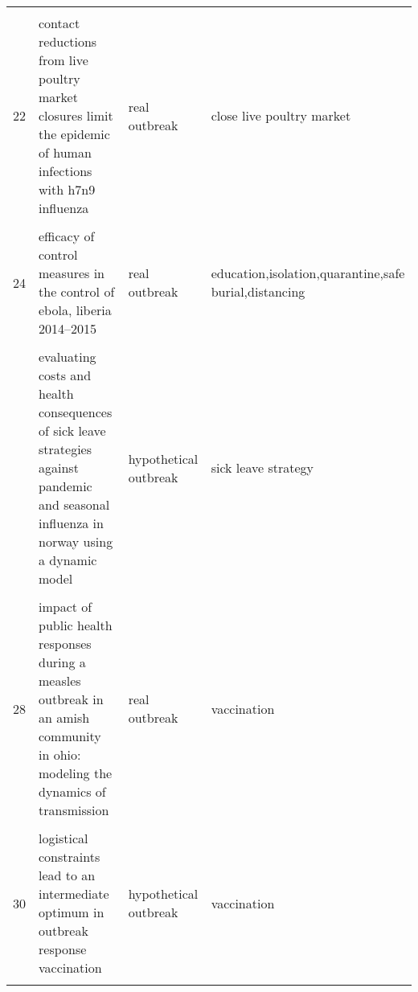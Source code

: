 \documentclass[
]{article}
\begin{document}
\begin{landscape}
\begin{longtable}{l>{\raggedright\arraybackslash}p{3cm}l>{\raggedright\arraybackslash}p{8cm}}
\addlinespace
\cellcolor{gray!6}{21} & \cellcolor{gray!6}{a new epidemics–logistics model: insights into controlling the ebola virus disease in west africa} & \cellcolor{gray!6}{real outbreak} & \cellcolor{gray!6}{ebola treatment units}\\
22 & contact reductions from live poultry market closures limit the epidemic of human infections with h7n9 influenza & real outbreak & close live poultry market\\
\cellcolor{gray!6}{23} & \cellcolor{gray!6}{disparities in spread and control of influenza in slums of delhi: findings from an agent-based modelling study} & \cellcolor{gray!6}{hypothetical outbreak} & \cellcolor{gray!6}{isolation,school closure,vaccination,stay home}\\
24 & efficacy of control measures in the control of ebola, liberia 2014–2015 & real outbreak & education,isolation,quarantine,safe burial,distancing\\
\cellcolor{gray!6}{25} & \cellcolor{gray!6}{epidemiology of the silent polio outbreak in rahat, israel, based on modeling of environmental surveillance data} & \cellcolor{gray!6}{real outbreak} & \cellcolor{gray!6}{vaccination}\\
\addlinespace
26 & evaluating costs and health consequences of sick leave strategies against pandemic and seasonal influenza in norway using a dynamic model & hypothetical outbreak & sick leave strategy\\
\cellcolor{gray!6}{27} & \cellcolor{gray!6}{evaluating vaccination strategies to control foot-and-mouth disease: a country comparison study} & \cellcolor{gray!6}{hypothetical outbreak} & \cellcolor{gray!6}{vaccination,stomping out}\\
28 & impact of public health responses during a measles outbreak in an amish community in ohio: modeling the dynamics of transmission & real outbreak & vaccination\\
\cellcolor{gray!6}{29} & \cellcolor{gray!6}{initial validation of a simulation model for estimating the impact of serogroup a neisseria meningitidis vaccination in the african meningitis belt} & \cellcolor{gray!6}{real outbreak} & \cellcolor{gray!6}{vaccination}\\
30 & logistical constraints lead to an intermediate optimum in outbreak response vaccination & hypothetical outbreak & vaccination\\
\addlinespace
\cellcolor{gray!6}{31} & \cellcolor{gray!6}{manipulation of contact network structure and the impact on foot-and-mouth disease transmission} & \cellcolor{gray!6}{real outbreak} & \cellcolor{gray!6}{rewiring}\\

\end{longtable}
\end{landscape}
\end{document}
